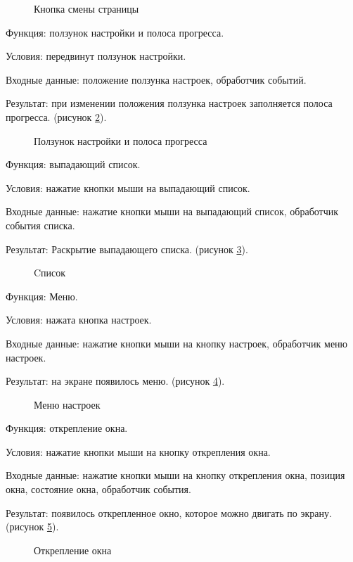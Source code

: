 \begin{figure}[H] %
	\caption{Кнопка смены страницы}
	\label{sheet:image}
\end{figure}

Функция: ползунок настройки и полоса прогресса.

Условия: передвинут ползунок настройки.

Входные данные: положение ползунка настроек, обработчик событий.

Результат: при изменении положения ползунка настроек заполняется полоса прогресса. (рисунок \ref{slider:image}).

\begin{figure}[H] %
	\caption{Ползунок настройки и полоса прогресса}
	\label{slider:image}
\end{figure}

Функция: выпадающий список.

Условия: нажатие кнопки мыши на выпадающий список.

Входные данные: нажатие кнопки мыши на выпадающий список, обработчик события списка.

Результат: Раскрытие выпадающего списка. (рисунок \ref{list:image}).

\begin{figure}[H] %
	\caption{Cписок}
	\label{list:image}
\end{figure}

Функция: Меню.

Условия: нажата кнопка настроек.

Входные данные: нажатие кнопки мыши на кнопку настроек, обработчик меню настроек.

Результат: на экране появилось меню. (рисунок \ref{menu:image}).

\begin{figure}[H] %
	\caption{Меню настроек}
	\label{menu:image}
\end{figure}

Функция: открепление окна.

Условия: нажатие кнопки мыши на кнопку открепления окна.

Входные данные: нажатие кнопки мыши на кнопку открепления окна, позиция окна, состояние окна, обработчик события.

Результат: появилось открепленное окно, которое можно двигать по экрану. (рисунок \ref{pin:image}).

\begin{figure}[H] %
	\caption{Открепление окна}
	\label{pin:image}
\end{figure}